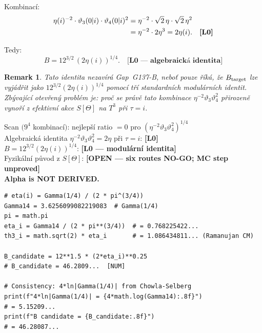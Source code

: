 \documentclass[12pt,a4paper]{article}
\newtheorem{remark}[theorem]{Remark}
\begin{document}
Kombinací:
\begin{align}
\eta(i)^{-2}\cdot\vartheta_3(0|i)\cdot\vartheta_4(0|i)^2
&= \eta^{-2}\cdot\sqrt{2}\,\eta\cdot\sqrt{2}\,\eta^2
\notag\\
&= \eta^{-2}\cdot 2\eta^3 = 2\eta(i). \quad \textbf{[L0]}
\end{align}

Tedy:
\[
\boxed{B = 12^{3/2}\,(2\eta(i))^{1/4}. \quad \textbf{[L0 — algebraická identita]}}
\]

\begin{remark}
Tato identita nezavírá Gap~G137-B, neboť pouze říká,
že $B_{\rm target}$ lze vyjádřit jako $12^{3/2}(2\eta(i))^{1/4}$
pomocí tří standardních modulárních identit.
Zbývající otevřený problém je: \emph{proč} se právě tato kombinace
$\eta^{-2}\vartheta_3\vartheta_4^2$ přirozeně vynoří z efektivní
akce $S[\Theta]$ na $T^3$ při $\tau=i$.
\end{remark}

\begin{statusbox}
Scan $(9^4$ kombinací$)$: nejlepší ratio $= 0$ pro
$(\eta^{-2}\vartheta_3\vartheta_4^2)^{1/4}$\\
Algebraická identita $\eta^{-2}\vartheta_3\vartheta_4^2 = 2\eta$ při $\tau=i$:
\textbf{[L0]}\\
$B = 12^{3/2}(2\eta(i))^{1/4}$: \textbf{[L0 — modulární identita]}\\
Fyzikální původ z $S[\Theta]$: \textbf{[OPEN — six routes NO-GO; MC step unproved]}\\
\textbf{Alpha is NOT DERIVED.}
\end{statusbox}
\begin{verbatim}
# eta(i) = Gamma(1/4) / (2 * pi^(3/4))
Gamma14 = 3.6256099082219083  # Gamma(1/4)
pi = math.pi
eta_i = Gamma14 / (2 * pi**(3/4))  # = 0.768225422...
th3_i = math.sqrt(2) * eta_i       # = 1.086434811... (Ramanujan CM)

B_candidate = 12**1.5 * (2*eta_i)**0.25
# B_candidate = 46.2809...  [NUM]

# Consistency: 4*ln|Gamma(1/4)| from Chowla-Selberg
print(f"4*ln|Gamma(1/4)| = {4*math.log(Gamma14):.8f}")
# = 5.15209...
print(f"B candidate = {B_candidate:.8f}")
# = 46.28087...
\end{verbatim}
\end{document}
